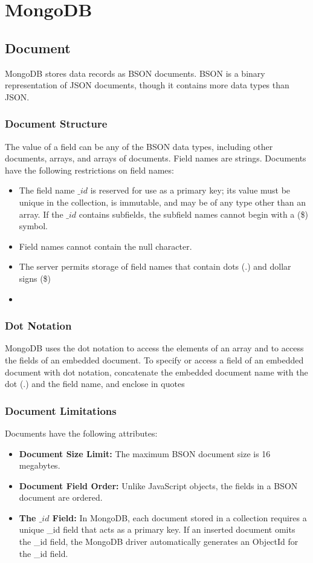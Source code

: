 \chapter{MongoDB}
\section{Document}
MongoDB stores data records as BSON documents. BSON is a binary representation of JSON documents, though it contains more data types than JSON. 

\subsection{Document Structure}
The value of a field can be any of the BSON data types, including other documents, arrays, and arrays of documents. Field names are strings. Documents have the following restrictions on field names:
\begin{itemize}
    \item The field name \(\_id\) is reserved for use as a primary key; its value must be unique in the collection, is immutable, and may be of any type other than an array. If the \(\_id\) contains subfields, the subfield names cannot begin with a (\$) symbol.
    \item Field names cannot contain the null character.
    \item The server permits storage of field names that contain dots (.) and dollar signs (\$)
    \item 
\end{itemize}

\subsection{Dot Notation}
MongoDB uses the dot notation to access the elements of an array and to access the fields of an embedded document.
To specify or access a field of an embedded document with dot notation, concatenate the embedded document name with the dot (.) and the field name, and enclose in quotes

\subsection{Document Limitations}
Documents have the following attributes:
\begin{itemize}
    \item \textbf{Document Size Limit:} The maximum BSON document size is 16 megabytes.
    \item \textbf{Document Field Order:} Unlike JavaScript objects, the fields in a BSON document are ordered.
    \item \textbf{The \(\_id\) Field:} In MongoDB, each document stored in a collection requires a unique \_id field that acts as a primary key. If an inserted document omits the \_id field, the MongoDB driver automatically generates an ObjectId for the \_id field.
\end{itemize}

